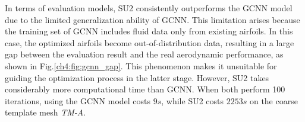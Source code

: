 In terms of evaluation models, SU2 consistently outperforms the GCNN model due to the limited generalization ability of GCNN. This limitation arises because the training set of GCNN includes fluid data only from existing airfoils. In this case, the optimized airfoils become out-of-distribution data, resulting in a large gap between the evaluation result and the real aerodynamic performance, as shown in Fig.\ref{ch4:fig:gcnn_gap}. This phenomenon makes it unsuitable for guiding the optimization process in the latter stage. However, SU2 takes considerably more computational time than GCNN. When both perform 100 iterations, using the GCNN model costs $9s$, while SU2 costs $2253s$ on the coarse template mesh \textit{TM-A}.
